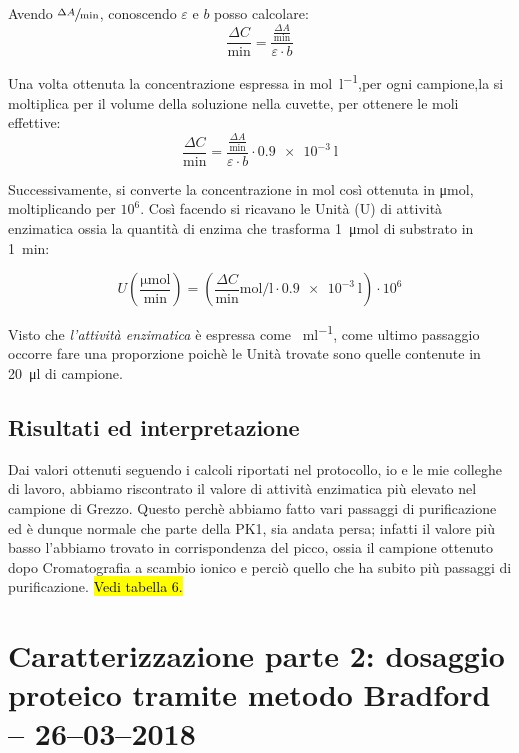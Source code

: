 \documentclass[twocolumn,a4paper,10pt]{my_report}
\begin{document}
{
Avendo $\sfrac{\Delta A}{\text{min}}$, conoscendo $\varepsilon$ e $b$ posso calcolare: $$\frac{\Delta C}{\text{min}}=\frac{\frac{\Delta A}{\text{min}}}{\varepsilon\cdot b}$$

Una volta ottenuta la concentrazione espressa in \si{\mole\per\litre},per ogni campione,la si moltiplica per il volume della soluzione nella cuvette, per ottenere le moli effettive: $$\frac{\Delta C}{\text{min}}=\frac{\frac{\Delta A}{\text{min}}}{\varepsilon\cdot b}\cdot \SI{0,9e-3}{\litre}$$

Successivamente, si converte la concentrazione in \si{\mol} così ottenuta in \si{\micro\mole}, moltiplicando per $10^{6}$. Così facendo si ricavano le Unità (U) di attività enzimatica ossia la quantità di enzima che trasforma \SI{1}{\micro\mole} di substrato in \SI{1}{\minute}:

$$U \left(\frac{\si{\micro\mole}}{\text{min}}\right) = \left(
	  \frac{\Delta C}{\text{min}}\si{\mole\per\litre}
      \cdot
      \SI{0,9e-3}{\litre}
    \right)\cdot10^{6}$$

Visto che \emph{l'attività enzimatica} è espressa come \si{\per\ml}, come ultimo passaggio occorre fare una proporzione poichè le Unità trovate sono quelle contenute in \SI{20}{\ul} di campione.

\subsection*{Risultati ed interpretazione}
Dai valori ottenuti seguendo i calcoli riportati nel protocollo, io e le mie colleghe di lavoro, abbiamo riscontrato il valore di attività enzimatica più elevato nel campione di Grezzo. Questo perchè abbiamo fatto vari passaggi di purificazione ed è dunque normale che parte della PK1, sia andata persa; infatti il valore più basso l'abbiamo trovato in corrispondenza del picco, ossia il campione ottenuto dopo Cromatografia a scambio ionico e perciò quello che ha subito più passaggi di purificazione. \hl{Vedi tabella 6.}

\section*{Caratterizzazione parte 2: dosaggio proteico tramite metodo Bradford -- 26--03--2018}
}
\end{document}
